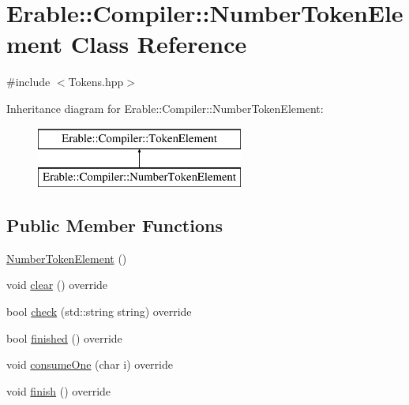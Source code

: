 \hypertarget{class_erable_1_1_compiler_1_1_number_token_element}{}\section{Erable\+::Compiler\+::Number\+Token\+Element Class Reference}
\label{class_erable_1_1_compiler_1_1_number_token_element}


{\ttfamily \#include $<$Tokens.\+hpp$>$}

Inheritance diagram for Erable\+::Compiler\+::Number\+Token\+Element\+:\begin{figure}[H]
\begin{center}
\leavevmode
\includegraphics[height=2.000000cm]{class_erable_1_1_compiler_1_1_number_token_element}
\end{center}
\end{figure}
\subsection*{Public Member Functions}
\begin{DoxyCompactItemize}
\item 
\mbox{\hyperlink{class_erable_1_1_compiler_1_1_number_token_element_a6ccd3f7ca622d19dfbc2c1d1fbf23616}{Number\+Token\+Element}} ()
\item 
void \mbox{\hyperlink{class_erable_1_1_compiler_1_1_number_token_element_addd51ef96a5f6a1129038c03f93b1792}{clear}} () override
\item 
bool \mbox{\hyperlink{class_erable_1_1_compiler_1_1_number_token_element_afcf6c322af0c870ac0ac47229cb4c248}{check}} (std\+::string string) override
\item 
bool \mbox{\hyperlink{class_erable_1_1_compiler_1_1_number_token_element_a7f8f35dcc3dac8a2e7566867304feb23}{finished}} () override
\item 
void \mbox{\hyperlink{class_erable_1_1_compiler_1_1_number_token_element_aa664539cd00997b60350d3ffd9cb1a7a}{consume\+One}} (char i) override
\item 
void \mbox{\hyperlink{class_erable_1_1_compiler_1_1_number_token_element_a06b45068c205e86e187d27685fe59e96}{finish}} () override
\end{DoxyCompactItemize}
